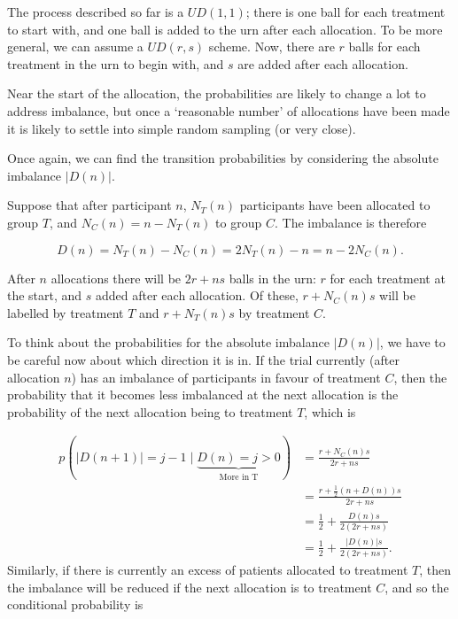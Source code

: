 \documentclass[
  openany]{book}
\theoremstyle{definition}
\theoremstyle{definition}
\theoremstyle{definition}
\theoremstyle{definition}
\theoremstyle{remark}
\begin{document}
The process described so far is a \(UD\left(1,1\right)\); there is one ball for each treatment to start with, and one ball is added to the urn after each allocation. To be more general, we can assume a \(UD\left(r,s\right)\) scheme. Now, there are \(r\) balls for each treatment in the urn to begin with, and \(s\) are added after each allocation.

Near the start of the allocation, the probabilities are likely to change a lot to address imbalance, but once a `reasonable number' of allocations have been made it is likely to settle into simple random sampling (or very close).

Once again, we can find the transition probabilities by considering the absolute imbalance \(\lvert D\left(n\right) \rvert\).

Suppose that after participant \(n\), \(N_T\left(n\right)\) participants have been allocated to group \(T\), and \(N_C\left(n\right) = n - N_T\left(n\right)\) to group \(C\). The imbalance is therefore

\[D\left(n\right) = N_T\left(n\right) - N_C\left(n\right) = 2N_T\left(n\right) - n = n - 2N_C\left(n\right).\]

After \(n\) allocations there will be \(2r + ns\) balls in the urn: \(r\) for each treatment at the start, and \(s\) added after each allocation. Of these, \(r + N_C\left(n\right)s\) will be labelled by treatment \(T\) and \(r + N_T\left(n\right)s\) by treatment \(C\).

To think about the probabilities for the absolute imbalance \(\lvert D\left(n\right)\rvert\), we have to be careful now about which direction it is in. If the trial currently (after allocation \(n\)) has an imbalance of participants in favour of treatment \(C\), then the probability that it becomes less imbalanced at the next allocation is the probability of the next allocation being to treatment \(T\), which is

\[
  \begin{aligned}
p\left(\lvert D\left(n+1\right)\rvert = j-1 \mid \underbrace{D\left(n\right)=j>0}_{\text{More in T}}\right) & = \frac{r + N_C\left(n\right)s}{2r + ns} \\
& = \frac{r + \frac{1}{2}\left(n + D\left(n\right)\right)s}{2r + ns} \\
& = \frac{1}{2} + \frac{D\left(n\right)s}{2\left(2r + ns\right)} \\
& = \frac{1}{2} + \frac{\lvert D\left(n\right)\rvert s}{2\left(2r + ns\right)}.
\end{aligned}
\]
Similarly, if there is currently an excess of patients allocated to treatment \(T\), then the imbalance will be reduced if the next allocation is to treatment \(C\), and so the conditional probability is
\end{document}
